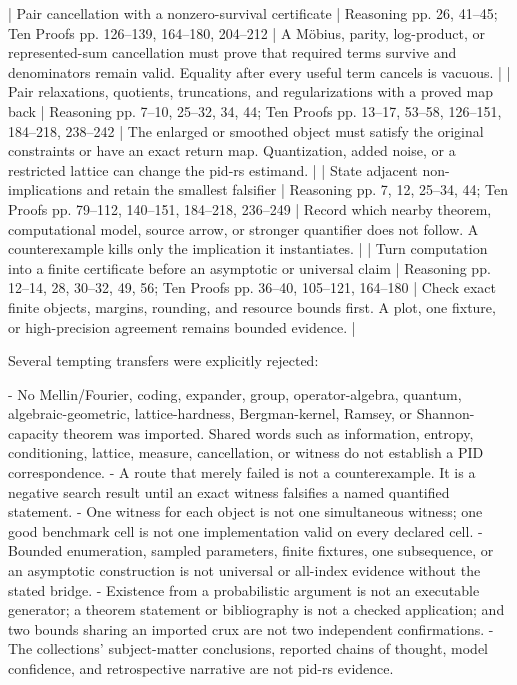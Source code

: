 \documentclass[11pt]{article}
\begin{document}
\begin{markdown}
| Pair cancellation with a nonzero-survival certificate | Reasoning pp. 26, 41--45; Ten Proofs pp. 126--139, 164--180, 204--212 | A Möbius, parity, log-product, or represented-sum cancellation must prove that required terms survive and denominators remain valid. Equality after every useful term cancels is vacuous. |
| Pair relaxations, quotients, truncations, and regularizations with a proved map back | Reasoning pp. 7--10, 25--32, 34, 44; Ten Proofs pp. 13--17, 53--58, 126--151, 184--218, 238--242 | The enlarged or smoothed object must satisfy the original constraints or have an exact return map. Quantization, added noise, or a restricted lattice can change the pid-rs estimand. |
| State adjacent non-implications and retain the smallest falsifier | Reasoning pp. 7, 12, 25--34, 44; Ten Proofs pp. 79--112, 140--151, 184--218, 236--249 | Record which nearby theorem, computational model, source arrow, or stronger quantifier does not follow. A counterexample kills only the implication it instantiates. |
| Turn computation into a finite certificate before an asymptotic or universal claim | Reasoning pp. 12--14, 28, 30--32, 49, 56; Ten Proofs pp. 36--40, 105--121, 164--180 | Check exact finite objects, margins, rounding, and resource bounds first. A plot, one fixture, or high-precision agreement remains bounded evidence. |

Several tempting transfers were explicitly rejected:

- No Mellin/Fourier, coding, expander, group, operator-algebra, quantum, algebraic-geometric,
  lattice-hardness, Bergman-kernel, Ramsey, or Shannon-capacity theorem was imported. Shared words
  such as information, entropy, conditioning, lattice, measure, cancellation, or witness do not
  establish a PID correspondence.
- A route that merely failed is not a counterexample. It is a negative search result until an
  exact witness falsifies a named quantified statement.
- One witness for each object is not one simultaneous witness; one good benchmark cell is not one
  implementation valid on every declared cell.
- Bounded enumeration, sampled parameters, finite fixtures, one subsequence, or an asymptotic
  construction is not universal or all-index evidence without the stated bridge.
- Existence from a probabilistic argument is not an executable generator; a theorem statement or
  bibliography is not a checked application; and two bounds sharing an imported crux are not two
  independent confirmations.
- The collections' subject-matter conclusions, reported chains of thought, model confidence, and
  retrospective narrative are not pid-rs evidence.


\end{markdown}
\end{document}
